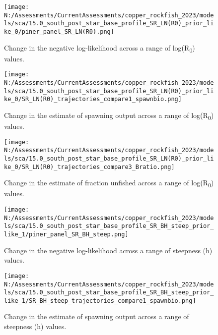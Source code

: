 \documentclass[11pt,
  english,
  letterpaper,
]{article}
\begin{document}
\begin{figure}
\centering
\texttt{[image: N:/Assessments/CurrentAssessments/copper\_rockfish\_2023/models/sca/15.0\_south\_post\_star\_base\_profile\_SR\_LN(R0)\_prior\_like\_0/piner\_panel\_SR\_LN(R0).png]}
\caption{Change in the negative log-likelihood across a range of log(R\textsubscript{0}) values.\label{fig:r0-profile}}
\end{figure}

\pagebreak

\begin{figure}
\centering
\texttt{[image: N:/Assessments/CurrentAssessments/copper\_rockfish\_2023/models/sca/15.0\_south\_post\_star\_base\_profile\_SR\_LN(R0)\_prior\_like\_0/SR\_LN(R0)\_trajectories\_compare1\_spawnbio.png]}
\caption{Change in the estimate of spawning output across a range of log(R\textsubscript{0}) values.\label{fig:r0-ssb}}
\end{figure}

\pagebreak

\begin{figure}
\centering
\texttt{[image: N:/Assessments/CurrentAssessments/copper\_rockfish\_2023/models/sca/15.0\_south\_post\_star\_base\_profile\_SR\_LN(R0)\_prior\_like\_0/SR\_LN(R0)\_trajectories\_compare3\_Bratio.png]}
\caption{Change in the estimate of fraction unfished across a range of log(R\textsubscript{0}) values.\label{fig:r0-depl}}
\end{figure}

\pagebreak

\begin{figure}
\centering
\texttt{[image: N:/Assessments/CurrentAssessments/copper\_rockfish\_2023/models/sca/15.0\_south\_post\_star\_base\_profile\_SR\_BH\_steep\_prior\_like\_1/piner\_panel\_SR\_BH\_steep.png]}
\caption{Change in the negative log-likelihood across a range of steepness (h) values.\label{fig:h-profile}}
\end{figure}

\pagebreak

\begin{figure}
\centering
\texttt{[image: N:/Assessments/CurrentAssessments/copper\_rockfish\_2023/models/sca/15.0\_south\_post\_star\_base\_profile\_SR\_BH\_steep\_prior\_like\_1/SR\_BH\_steep\_trajectories\_compare1\_spawnbio.png]}
\caption{Change in the estimate of spawning output across a range of steepness (h) values.\label{fig:h-ssb}}
\end{figure}
\end{document}
